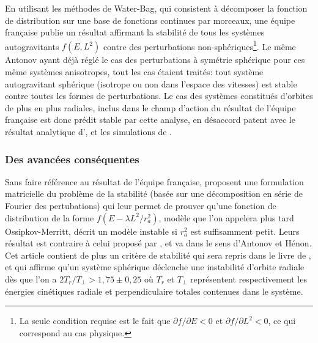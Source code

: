 En utilisant les méthodes de Water-Bag, qui consistent à décomposer la fonction de distribution sur une base de fonctions continues par morceaux,
une équipe française \cite{waterbag} publie un résultat affirmant la stabilité de tous les systèmes autogravitants $f\left(  E,L^{2}\right)  $ contre
des perturbations non-sphériques\footnote{La seule condition requise est le fait que $\partial f/\partial E<0$ et $\partial f/\partial L^{2}<0$, ce
qui correspond au cas physique.}. Le même Antonov ayant déjà réglé le cas des perturbations à symétrie sphérique pour ces même systèmes anisotropes, tout les
cas étaient traités: tout système autogravitant sphérique (isotrope ou non dans l'espace des vitesses) est stable contre toutes les formes de
perturbations. Le cas des systèmes constitués d'orbites de plus en plus radiales, inclus dans le champ d'action du résultat de l'équipe française est
donc prédit stable par cette analyse, en désaccord patent avec le résultat analytique d'\cite{antonov}, et les simulations de \cite{henon}.

\subsubsection{Des avancées conséquentes\label{roiadvances}}

Sans faire référence au résultat de l'équipe française, \citet{polyach} proposent une formulation matricielle du problème de
la stabilité (basée sur une décomposition en série de Fourier des pertubations) qui leur permet de prouver qu'une fonction de distribution de la forme
$f\left(  E-\lambda L^{2}/r_{a}^{2}\right)$, modèle que l'on appelera plus tard Ossipkov-Merritt, décrit un modèle instable si $r_{a}^{2}$ est
suffisamment petit. Leurs résultat est contraire à celui proposé par \cite{waterbag}, et va dans
le sens d'Antonov et Hénon. Cet article contient de plus un critère de stabilité qui sera repris dans le livre de \citet{1984pgs1.book.....F,1984pgs2.book.....F}
, et qui
affirme qu'un système sphérique déclenche une instabilité d'orbite radiale dès que l'on a $2T_{r}/T_{\perp}>1,75\pm0,25$ o\`{u} $T_{r}$ et
$T_{\perp}$ représentent respectivement les énergies cinétiques radiale et perpendiculaire totales contenues dans le système.

